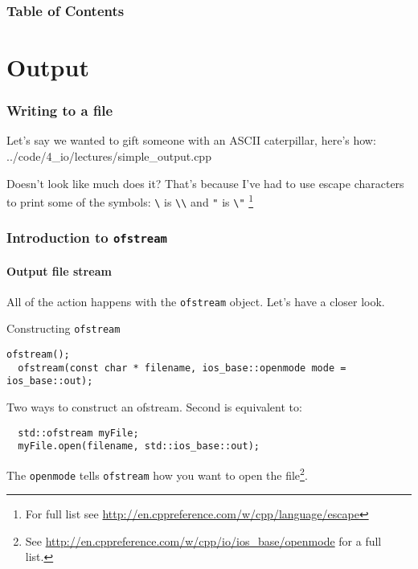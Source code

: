 \documentclass{beamer}
\subtitle{Session 4: Input, output and text manipulation}
\begin{document}
\frame{\titlepage}

\begin{frame}
\frametitle{Table of Contents}
\tableofcontents
\end{frame}

\section{Output}

\begin{frame}[fragile]
  \frametitle{Writing to a file}
  
  Let's say we wanted to gift someone with an ASCII caterpillar, here's how:
  \pause
  	{../code/4_io/lectures/simple_output.cpp}

  Doesn't look like much does it?  That's because I've had to use escape characters to print some of the symbols:
  	\texttt{\textbackslash} is \texttt{\textbackslash\textbackslash} and
  	\texttt{"}  is \texttt{\textbackslash"} \footnote{For full list see \url{http://en.cppreference.com/w/cpp/language/escape}}

\end{frame}

\begin{frame}[fragile]
  \frametitle{Introduction to  \texttt{ofstream}}
  \framesubtitle{\textbf{O}utput \textbf{f}ile \textbf{stream}}
  All of the action happens with the \texttt{ofstream} object.  Let's have a closer look.
  \pause
  \begin{block}{Constructing \texttt{ofstream}}
    \begin{lstlisting}[aboveskip=0pt]
  ofstream();
  ofstream(const char * filename, ios_base::openmode mode = ios_base::out);
    \end{lstlisting}
  Two ways to construct an ofstream.  Second is equivalent to:
    \begin{lstlisting}
  std::ofstream myFile;
  myFile.open(filename, std::ios_base::out);
    \end{lstlisting}
    The \texttt{openmode} tells \texttt{ofstream} how you want to open the file\footnote{See \url{http://en.cppreference.com/w/cpp/io/ios_base/openmode} for a full list.}.
  \end{block}

\end{frame}
\end{document}
